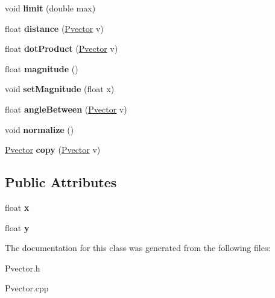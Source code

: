 \begin{DoxyCompactItemize}
\item 
void {\bfseries limit} (double max)\hypertarget{class_pvector_a2c31c0b80bab261fe888395f781328f1}{}\label{class_pvector_a2c31c0b80bab261fe888395f781328f1}

\item 
float {\bfseries distance} (\hyperlink{class_pvector}{Pvector} v)\hypertarget{class_pvector_ad756657de9657b79cf6889ca3161c64e}{}\label{class_pvector_ad756657de9657b79cf6889ca3161c64e}

\item 
float {\bfseries dot\+Product} (\hyperlink{class_pvector}{Pvector} v)\hypertarget{class_pvector_a4eecd15faddd549f3d99002c42b846e9}{}\label{class_pvector_a4eecd15faddd549f3d99002c42b846e9}

\item 
float {\bfseries magnitude} ()\hypertarget{class_pvector_a1aa0154d1d3c92a596610fa366fcfe6c}{}\label{class_pvector_a1aa0154d1d3c92a596610fa366fcfe6c}

\item 
void {\bfseries set\+Magnitude} (float x)\hypertarget{class_pvector_a72261b3f2e1fc1851202f9a96abd8dc1}{}\label{class_pvector_a72261b3f2e1fc1851202f9a96abd8dc1}

\item 
float {\bfseries angle\+Between} (\hyperlink{class_pvector}{Pvector} v)\hypertarget{class_pvector_a7c57bb4e92a54b9d3ebb7f2c4c13743f}{}\label{class_pvector_a7c57bb4e92a54b9d3ebb7f2c4c13743f}

\item 
void {\bfseries normalize} ()\hypertarget{class_pvector_af21ee637474eff3c3387a7b7d138004a}{}\label{class_pvector_af21ee637474eff3c3387a7b7d138004a}

\item 
\hyperlink{class_pvector}{Pvector} {\bfseries copy} (\hyperlink{class_pvector}{Pvector} v)\hypertarget{class_pvector_af5e109a5f1261c4ee69b6f213d7d6154}{}\label{class_pvector_af5e109a5f1261c4ee69b6f213d7d6154}

\end{DoxyCompactItemize}
\subsection*{Public Attributes}
\begin{DoxyCompactItemize}
\item 
float {\bfseries x}\hypertarget{class_pvector_a7ba0ffff299fbf5e127d1849a9c5c87a}{}\label{class_pvector_a7ba0ffff299fbf5e127d1849a9c5c87a}

\item 
float {\bfseries y}\hypertarget{class_pvector_ab9d5ab87022aa781382b8eb4b944b375}{}\label{class_pvector_ab9d5ab87022aa781382b8eb4b944b375}

\end{DoxyCompactItemize}


The documentation for this class was generated from the following files\+:\begin{DoxyCompactItemize}
\item 
Pvector.\+h\item 
Pvector.\+cpp\end{DoxyCompactItemize}
